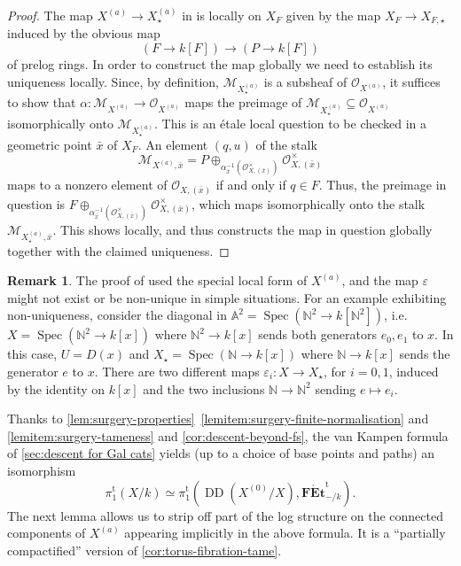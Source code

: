 \documentclass[a4paper,twoside,11pt,reqno]{amsart}
\renewcommand{\mathbb}{\mathds}
\newcommand{\bA}{{\mathbb A}}
\newcommand{\bN}{{\mathbb N}}
\newcommand{\cM}{{\mathcal M}}
\newcommand{\cO}{{\mathcal O}}
\newcommand{\la}{\longrightarrow}
\DeclareMathOperator{\Spec}{Spec}
\newcommand{\cat}[1]{\mathbf{#1}}
\newcommand{\pitame}{\pi_1^{\mathrm{t}}}
\newcommand{\FEtt}{{\cat{F\acute{E}t}}^{\!\mathrm{t}}}
\DeclareMathOperator{\Desc}{DD}
\theoremstyle{definition}
\newtheorem{rmk}[thm]{Remark}
\numberwithin{equation}{subsection}
\begin{document}
\begin{proof}
The map $X^{(a)}\to X^{(a)}_\star$ in  is locally on $X_F$ given by  the map $X_F\to X_{F,\star}$ induced by the obvious map 
\[
(F \to k[F]) \la (P \to k[F])
\]
of prelog rings. In order to construct the map globally we need to establish its uniqueness locally. 
Since, by definition, $\cM_{X^{(a)}_\star}$ is a subsheaf of $\cO_{X^{(a)}}$, it suffices to show that $\alpha\colon \cM_{X^{(a)}}\to\cO_{X^{(a)}}$ maps the preimage of $\cM_{X^{(a)}_\star}\subseteq \cO_{X^{(a)}}$ isomorphically onto $\cM_{X^{(a)}_\star}$. This is an \'etale  local question to be checked in a geometric point $\bar{x}$ of $X_F$.  An element $(q,u)$ of the stalk 
\[
\cM_{X^{(a)},\bar x} = P\oplus_{\alpha_{\bar x}^{-1}(\cO_{X,(\bar x)}^\times)} \cO_{X,(\bar x)}^\times
\]
maps to a nonzero element of $\cO_{X,(\bar x)}$ if and only if $q\in F$. Thus, the preimage in question is $F\oplus_{\alpha_{\bar x}^{-1}(\cO_{X,(\bar x)}^\times)} \cO_{X,(\bar x)}^\times$, which maps isomorphically onto the stalk $\cM_{X^{(a)}_\star, \bar x}$. This shows  locally, and thus constructs the map in question globally together with the claimed uniqueness.
\end{proof}

\begin{rmk}
    The proof of  used the special local form of $X^{(a)}$, and the map $\varepsilon$ might not exist or be non-unique in simple situations. For an example exhibiting non-uniqueness, consider the diagonal in $\bA^2 = \Spec(\bN^2\to k[\bN^2])$, i.e.\ $X=\Spec(\bN^2\to k[x])$ where $\bN^2\to k[x]$ sends both generators $e_0,e_1$ to $x$. In this case, $U=D(x)$ and $X_\star = \Spec(\bN\to k[x])$ where $\bN\to k[x]$ sends the generator $e$ to $x$. There are two different maps $\varepsilon_i\colon X \to X_\star$, for $i=0,1$, induced by the identity on $k[x]$ and the two inclusions $\bN\to\bN^2$ sending $e\mapsto e_i$.
\end{rmk}

Thanks to \cref{lem:surgery-properties}~\ref{lemitem:surgery-finite-normalisation} and \ref{lemitem:surgery-tameness} and \cref{cor:descent-beyond-fs}, the van Kampen formula of \cref{sec:descent for Gal cats} yields (up to a choice of base points and paths) an isomorphism
\[ 
    \pitame(X/k) \simeq \pitame(\Desc(X^{(0)}/X), \FEtt_{-/k}).
\]
The next lemma allows us to strip off part of the log structure on the connected components of $X^{(a)}$ appearing implicitly in the above formula. It is a ``partially compactified'' version of \cref{cor:torus-fibration-tame}.
\end{document}
